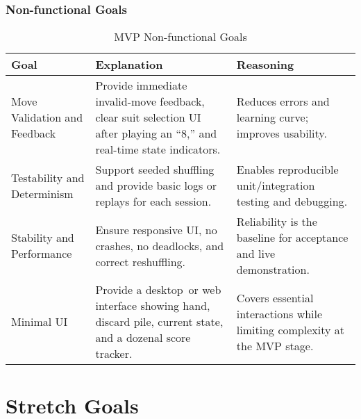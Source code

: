 \documentclass{article}
\begin{document}
    \subsubsection{Non-functional Goals}
    \begin{table}[h!]
        \caption{MVP Non-functional Goals}\label{TblMVPNonFunctionalGoals}
        \begin{tabularx}{\textwidth}{|L|L|L|}
            \hline
            \textbf{Goal} & \textbf{Explanation} & \textbf{Reasoning} \\
            \hline
            Move Validation and Feedback &
            Provide immediate invalid-move feedback, clear suit selection UI after playing an ``8,'' and real-time state indicators. &
            Reduces errors and learning curve; improves usability. \\
            \hline
            Testability and Determinism &
            Support seeded shuffling and provide basic logs or replays for each session. &
            Enables reproducible unit/integration testing and debugging. \\
            \hline
            Stability and Performance &
            Ensure responsive UI, no crashes, no deadlocks, and correct reshuffling. &
            Reliability is the baseline for acceptance and live demonstration. \\
            \hline
            Minimal UI &
            Provide a desktop~or web interface showing hand, discard pile, current state, and a dozenal score tracker. &
            Covers essential interactions while limiting complexity at the MVP stage. \\
            \hline
        \end{tabularx}
    \end{table}

    \section{Stretch Goals}
\end{document}
